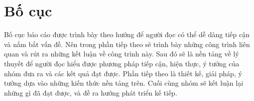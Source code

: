 \section{Bố cục}
Bố cục báo cáo được trình bày theo hướng để người đọc có thể dễ dàng tiếp
cận và nắm bắt vấn đề. Nên trong phần tiếp theo sẽ trình bày những công
trình liên quan và rút ra những kết luận về công trình này. Sau đó sẽ là nền
tảng về lý thuyết để người đọc hiểu được phương pháp tiếp cận, hiện thực, ý
tưởng của nhóm đưa ra và các kết quả đạt được. Phần tiếp theo là thiết kế, giải
pháp, ý tưởng dựa vào những kiến thức nền tảng trên. Cuối cùng nhóm sẽ kết luận lại những gì
đã đạt được, và đề ra hướng phát triển kế tiếp. 
